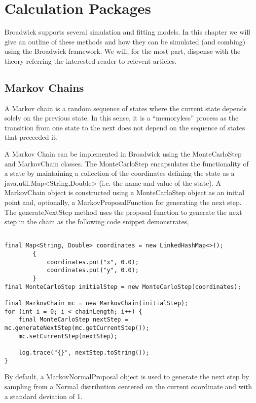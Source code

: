 \chapter{Calculation Packages}

Broadwick supports several simulation and fitting models. In this chapter we will give an outline of these methods and how they can be simulated (and combing) using the Broadwick framework. We will, for the most part, dispense with the theory referring the interested reader to relevent articles.




\section{Markov Chains}

A Markov chain is a random sequence of states where the current state depends solely on the previous state. In this sense, it is a ``memoryless'' process as the transition from one state to the next does not depend on the sequence of states that preceeded it.

A Markov Chain can be implemented in Broadwick using the MonteCarloStep and MarkovChain classes. The MonteCarloStep encapsulates the functionality of a state by maintaining a collection of the coordinates defining the state as a java.util.Map<String,Double> (i.e. the name and value of the state). A MarkovChain object is constructed using a MonteCarloStep object as an initial point and, optionally, a MarkovProposalFunction for generating the next step. The generateNextStep method uses the proposal function to generate the next step in the chain as the following code snippet demonstrates,

\begin{lstlisting}

final Map<String, Double> coordinates = new LinkedHashMap<>();
        {
            coordinates.put("x", 0.0);
            coordinates.put("y", 0.0);
        }
final MonteCarloStep initialStep = new MonteCarloStep(coordinates);

final MarkovChain mc = new MarkovChain(initialStep);
for (int i = 0; i < chainLength; i++) {
    final MonteCarloStep nextStep = mc.generateNextStep(mc.getCurrentStep());
    mc.setCurrentStep(nextStep);

    log.trace("{}", nextStep.toString());
}
\end{lstlisting}

By default, a MarkovNormalProposal object is used to generate the next step by sampling from a Normal distribution centered on the current coordinate and with a standard deviation of 1.


